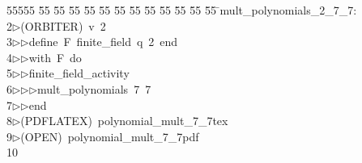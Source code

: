 %
%
\begin{tabbing}
55555 \= 55 \= 55 \= 55 \= 55 \= 55 \= 55 \= 55 \= 55 \= 55 \= 55 \= 55 \= 55 \= \>mult\_polynomials\_2\_7\_7:\\[0pt]
2\>$\triangleright$\>(ORBITER)\ v\ 2\ \\[0pt]
3\>$\triangleright$\>$\triangleright$\>define\ F\ finite\_field\ q\ 2\ end\ \\[0pt]
4\>$\triangleright$\>$\triangleright$\>with\ F\ do\ \\[0pt]
5\>$\triangleright$\>$\triangleright$\>finite\_field\_activity\ \\[0pt]
6\>$\triangleright$\>$\triangleright$\>$\triangleright$\>mult\_polynomials\ 7\ 7\ \\[0pt]
7\>$\triangleright$\>$\triangleright$\>end\\[0pt]
8\>$\triangleright$\>(PDFLATEX)\ polynomial\_mult\_7\_7tex\\[0pt]
9\>$\triangleright$\>(OPEN)\ polynomial\_mult\_7\_7pdf\\[0pt]
10\>\end{tabbing}
